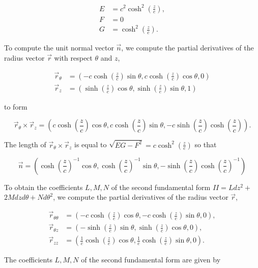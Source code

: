 \documentclass[10pt]{article}
\begin{document}
$$
\begin{aligned}
E & =c^{2} \cosh ^{2}\left(\frac{z}{c}\right), \\
F & =0 \\
G & =\cosh ^{2}\left(\frac{z}{c}\right) .
\end{aligned}
$$

To compute the unit normal vector $\vec{n}$, we compute the partial derivatives of the radius vector $\vec{r}$ with respect $\theta$ and $z$,

$$
\begin{aligned}
\vec{r}_{\theta} & =\left(-c \cosh \left(\frac{z}{c}\right) \sin \theta, c \cosh \left(\frac{z}{c}\right) \cos \theta, 0\right) \\
\vec{r}_{z} & =\left(\sinh \left(\frac{z}{c}\right) \cos \theta, \sinh \left(\frac{z}{c}\right) \sin \theta, 1\right)
\end{aligned}
$$

to form

$$
\vec{r}_{\theta} \times \vec{r}_{z}=\left(c \cosh \left(\frac{z}{c}\right) \cos \theta, c \cosh \left(\frac{z}{c}\right) \sin \theta,-c \sinh \left(\frac{z}{c}\right) \cosh \left(\frac{z}{c}\right)\right) .
$$

The length of $\vec{r}_{\theta} \times \vec{r}_{z}$ is equal to $\sqrt{E G-F^{2}}=c \cosh ^{2}\left(\frac{z}{c}\right)$ so that

$$
\vec{n}=\left(\cosh \left(\frac{z}{c}\right)^{-1} \cos \theta, \cosh \left(\frac{z}{c}\right)^{-1} \sin \theta,-\sinh \left(\frac{z}{c}\right) \cosh \left(\frac{z}{c}\right)^{-1}\right)
$$

To obtain the coefficients $L, M, N$ of the second fundamental form $I I=L d z^{2}+$ $2 M d z d \theta+N d \theta^{2}$, we compute the partial derivatives of the radius vector $\vec{r}$,

$$
\begin{aligned}
\vec{r}_{\theta \theta} & =\left(-c \cosh \left(\frac{z}{c}\right) \cos \theta,-c \cosh \left(\frac{z}{c}\right) \sin \theta, 0\right), \\
\vec{r}_{\theta z} & =\left(-\sinh \left(\frac{z}{c}\right) \sin \theta, \sinh \left(\frac{z}{c}\right) \cos \theta, 0\right), \\
\vec{r}_{z z} & =\left(\frac{1}{c} \cosh \left(\frac{z}{c}\right) \cos \theta, \frac{1}{c} \cosh \left(\frac{z}{c}\right) \sin \theta, 0\right) .
\end{aligned}
$$

The coefficients $L, M, N$ of the second fundamental form are given by
\end{document}
